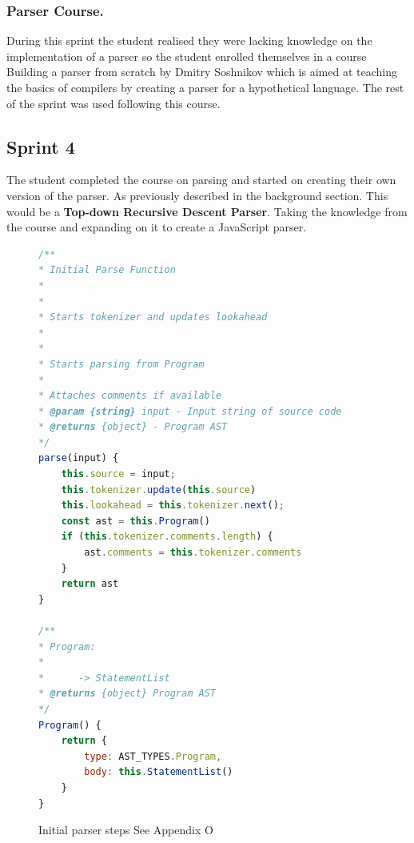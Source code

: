 \subsubsection{Parser Course.}
During this sprint the student realised they were lacking knowledge on the implementation of a parser so the student enrolled themselves in a course 
Building a parser from scratch by Dmitry Soshnikov \cite{parserCourse} which is aimed at teaching the basics of compilers by creating 
a parser for a hypothetical language. The rest of the sprint was used following this course.


\subsection{Sprint 4}
The student completed the course on parsing and started on creating their own version of the parser. As previously described in the background section. This 
would be a \textbf{Top-down Recursive Descent Parser}. Taking the knowledge from the course and expanding on it to create a JavaScript parser.
\begin{figure}[h]
    \begin{lstlisting}[language=Javascript]
/**
* Initial Parse Function
* 
* 
* Starts tokenizer and updates lookahead
* 
* 
* Starts parsing from Program
* 
* Attaches comments if available
* @param {string} input - Input string of source code
* @returns {object} - Program AST 
*/
parse(input) {
    this.source = input;
    this.tokenizer.update(this.source)
    this.lookahead = this.tokenizer.next();
    const ast = this.Program()
    if (this.tokenizer.comments.length) {
        ast.comments = this.tokenizer.comments
    }
    return ast
}
   
/**
* Program:
* 
*      -> StatementList
* @returns {object} Program AST
*/
Program() {
    return {
        type: AST_TYPES.Program,
        body: this.StatementList()
    }
}   
    \end{lstlisting}
    \caption{Initial parser steps  See Appendix O}
    \label{fig:parser1}
\end{figure}
